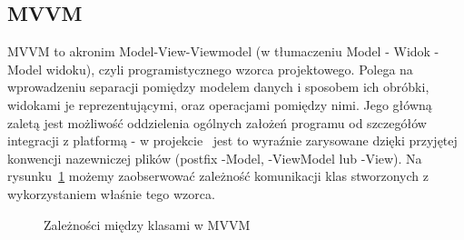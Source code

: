 \subsection{MVVM}
MVVM to akronim Model-View-Viewmodel (w tłumaczeniu Model - Widok - Model widoku), czyli programistycznego wzorca projektowego.
Polega na wprowadzeniu separacji pomiędzy modelem danych i sposobem ich obróbki, widokami je reprezentującymi, oraz operacjami pomiędzy nimi. 
Jego główną zaletą jest możliwość oddzielenia ogólnych założeń programu od szczegółów integracji z platformą 
- w projekcie~\cite{Halaczkiewicz_Navigator_GitHub} jest to wyraźnie zarysowane dzięki przyjętej 
konwencji nazewniczej plików (postfix -Model, -ViewModel lub -View).
Na rysunku~\ref{fig:MVVM_diagram} możemy zaobserwować zależność komunikacji klas stworzonych z wykorzystaniem właśnie tego wzorca.

\begin{figure}[!htp]
    \centering
    \caption{Zależności między klasami w MVVM~\cite{mvvm}}
    \label{fig:MVVM_diagram}
\end{figure}